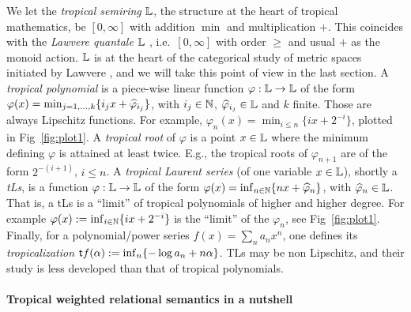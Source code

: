 \documentclass[submission,%
]{eptcs}
\begin{document}
We let the \emph{tropical semiring}  $\mathbb{L}$, the structure at the heart of tropical mathematics, be $[0,\infty]$ with addition $\min$ and multiplication $+$.
This coincides with the \emph{Lawvere quantale} $\mathbb{L}$ \cite{Hofmann2014, Stubbe2014}, i.e.\ $[0,\infty]$ with order $\geq$ and usual $+$ as the monoid action. 
$\mathbb{L}$ is at the heart of the categorical study of metric spaces initiated by Lawvere \cite{Lawvere1973}, and we will take this point of view in the last section.
A \emph{tropical polynomial} is a piece-wise linear function $\varphi:\mathbb{L}\to \mathbb{L}$ of the form $\varphi(x)=\min_{j=1,\dots,k}\{i_{j}x+\widehat{\varphi}_{i_{j}}\}$, with $i_{j}\in\mathbb{N}$, $\widehat{\varphi}_{i_{j}}\in\mathbb{L}$ and $k$ finite.
Those are always Lipschitz functions.
For example, $\varphi_{n}(x)=\min_{i\leq n}\{ix+2^{-i}\}$, plotted in Fig~\ref{fig:plot1}.
A \emph{tropical root} of $\varphi$ is a point $x\in \mathbb{L}$ where the minimum defining $\varphi$ is attained at least twice.%
E.g., the tropical roots of $\varphi_{n+1}$ are of the form $2^{-(i+1)}$, $i \leq n$.
A \emph{tropical Laurent series} (of one variable $x\in\mathbb{L}$), shortly a \emph{tLs}, is a function $\varphi:\mathbb{L}\to \mathbb{L}$ of the form $\varphi(x)=\inf_{n\in\mathbb{N}}\{nx+\widehat{\varphi}_{n}\}$, with $\widehat{\varphi}_{n}\in\mathbb{L}$.
That is, a tLs is a ``limit'' of tropical polynomials of higher and higher degree.
For example $\varphi(x):=\inf_{i\in\mathbb{N}}\{ix+2^{-i}\}$ %
is the ``limit'' of the $\varphi_{n}$, see Fig~\ref{fig:plot1}. %
Finally, for a polynomial/power series $f(x)=\sum_n a_nx^n$, one defines its \emph{tropicalization} $\mathsf{t} f(\alpha):=\inf_n\{-\log a_n+n\alpha\}$.
TLs may be non Lipschitz, and their study is less developed than that of tropical polynomials.

\paragraph{Tropical weighted relational semantics in a nutshell}
\end{document}
